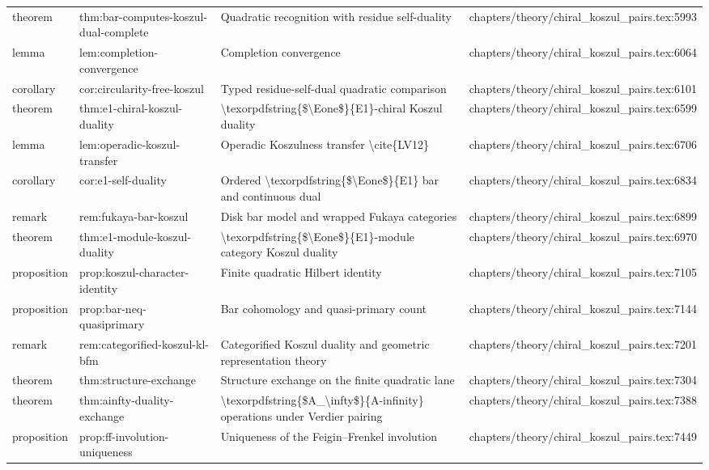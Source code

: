 \documentclass[11pt]{article}
\begin{document}
\begin{longtable}{L{0.10\textwidth}L{0.26\textwidth}L{0.42\textwidth}L{0.22\textwidth}}
theorem & thm:bar-computes-koszul-dual-complete & Quadratic recognition with residue self-duality & chapters/theory/chiral\_koszul\_pairs.tex:5993\\
lemma & lem:completion-convergence & Completion convergence & chapters/theory/chiral\_koszul\_pairs.tex:6064\\
corollary & cor:circularity-free-koszul & Typed residue-self-dual quadratic comparison & chapters/theory/chiral\_koszul\_pairs.tex:6101\\
theorem & thm:e1-chiral-koszul-duality & \textbackslash{}texorpdfstring\{\$\textbackslash{}Eone\$\}\{E1\}-chiral Koszul duality & chapters/theory/chiral\_koszul\_pairs.tex:6599\\
lemma & lem:operadic-koszul-transfer & Operadic Koszulness transfer \textbackslash{}cite\{LV12\} & chapters/theory/chiral\_koszul\_pairs.tex:6706\\
corollary & cor:e1-self-duality & Ordered \textbackslash{}texorpdfstring\{\$\textbackslash{}Eone\$\}\{E1\} bar and continuous dual & chapters/theory/chiral\_koszul\_pairs.tex:6834\\
remark & rem:fukaya-bar-koszul & Disk bar model and wrapped Fukaya categories & chapters/theory/chiral\_koszul\_pairs.tex:6899\\
theorem & thm:e1-module-koszul-duality & \textbackslash{}texorpdfstring\{\$\textbackslash{}Eone\$\}\{E1\}-module category Koszul duality & chapters/theory/chiral\_koszul\_pairs.tex:6970\\
proposition & prop:koszul-character-identity & Finite quadratic Hilbert identity & chapters/theory/chiral\_koszul\_pairs.tex:7105\\
proposition & prop:bar-neq-quasiprimary & Bar cohomology and quasi-primary count & chapters/theory/chiral\_koszul\_pairs.tex:7144\\
remark & rem:categorified-koszul-kl-bfm & Categorified Koszul duality and geometric representation theory & chapters/theory/chiral\_koszul\_pairs.tex:7201\\
theorem & thm:structure-exchange & Structure exchange on the finite quadratic lane & chapters/theory/chiral\_koszul\_pairs.tex:7304\\
theorem & thm:ainfty-duality-exchange & \textbackslash{}texorpdfstring\{\$A\_\textbackslash{}infty\$\}\{A-infinity\} operations under Verdier pairing & chapters/theory/chiral\_koszul\_pairs.tex:7388\\
proposition & prop:ff-involution-uniqueness & Uniqueness of the Feigin--Frenkel involution & chapters/theory/chiral\_koszul\_pairs.tex:7449\\

\end{longtable}
\end{document}
